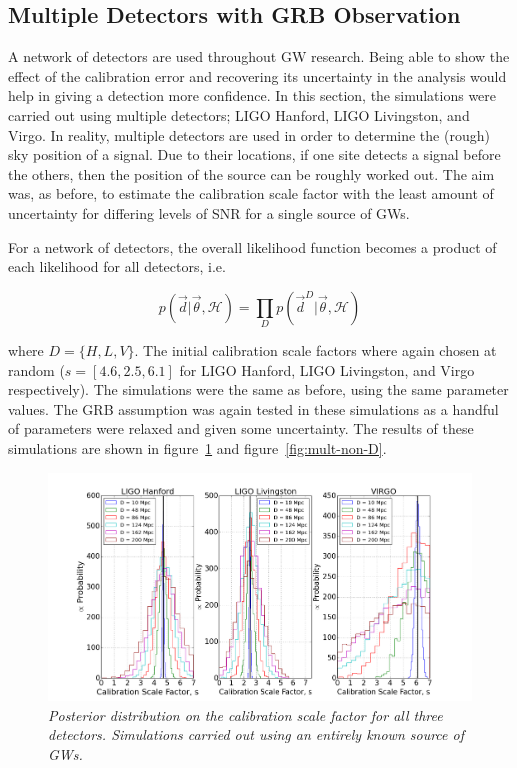 \documentclass{jpconf}
\newcommand{\curlH}{\mathcal{H}}
\begin{document}
\subsection{Multiple Detectors with GRB Observation}
\label{sec:mdgrb}
A network of detectors are used throughout GW research. Being able to show the effect of the calibration error and recovering its uncertainty in the analysis would help in giving a detection more confidence. In this section, the simulations were carried out using multiple detectors; LIGO Hanford, LIGO Livingston, and Virgo. In reality, multiple detectors are used in order to determine the (rough) sky position of a signal. Due to their locations, if one site detects a signal before the others, then the position of the source can be roughly worked out. The aim was, as before, to estimate the calibration scale factor with the least amount of uncertainty for differing levels of SNR for a single source of GWs. 

For a network of detectors, the overall likelihood function becomes a product of each likelihood for all detectors, i.e.

\begin{equation}
  \label{eq:mult-likeli}
  p(\vec{d}| \vec{\theta}, \curlH) = \prod \limits_D p(\vec{d}^D| \vec{\theta}, \curlH)
\end{equation}

where $D = \{H,L,V\}$. The initial calibration scale factors where again chosen at random ($s = [4.6, 2.5, 6.1]$ for LIGO Hanford, LIGO Livingston, and Virgo respectively). The simulations were the same as before, using the same parameter values. The GRB assumption was again tested in these simulations as a handful of parameters were relaxed and given some uncertainty. The results of these simulations are shown in figure~\ref{fig:mult-empty-D} and figure~\ref{fig:mult-non-D}.


\begin{figure}[h]
  \centering
  \includegraphics[width = \textwidth]{MD_empty_D10_200}
  \captionsetup{justification=centering}
  \caption{\textit{Posterior distribution on the calibration scale factor for all three detectors. Simulations carried out using an entirely known source of GWs.}}
    \label{fig:mult-empty-D}
\end{figure}
\end{document}
